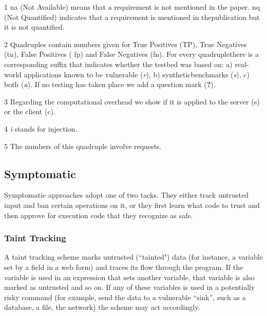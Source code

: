 \documentclass[conference]{IEEEtran}
\begin{document}
\begin{table}
\begin{threeparttable}
\begin{small}
\begin{tablenotes}
\begin{footnotesize}
        \item[1] {\sc na} (Not Available) means that a requirement is not mentioned in the paper.
  {\sc nq} (Not Quantified) indicates that a requirement is mentioned in the\newline publication
  but it is not quantified.
      \item[2] Quadruples contain numbers given for True Positives
        ({\sc TP}), True Negatives ({\sc tn}), False Positives ({\sc
          fp}) and False Negatives ({\sc fn}). For every quadruple\newline there is a corresponding suffix that indicates whether the testbed was
  based on: a) real-world applications known to be vulnerable ({\it r}), b) synthetic\newline benchmarks ({\it s}), c) both ({\it a}).
  If no testing has taken place we add a question mark ({\bf ?}).
    \item[3] Regarding the computational overhead we show if it is applied to the server ({\sc s}) or the client ({\sc c}). 
    \item[4] {\it i} stands for injection.
    \item[5] The numbers of this quadruple involve requests.
  \end{footnotesize}
    \end{tablenotes}
    \end{small}
    \end{threeparttable}
\end{table}

\subsection{Symptomatic}

Symptomatic approaches adopt one of two tacks. They either track
untrusted input and ban certain operations on it, or they first learn what
code to trust and then approve for execution code that they recognize
as safe.

\subsubsection{Taint Tracking}
\label{sec:taint}

A taint tracking scheme marks untrusted (``tainted") data (for
instance, a variable set by a field in a web form) and traces its flow
through the program. If the variable is used in an expression that
sets another variable, that variable is also marked as untrusted and
so on. If any of these variables is used in a potentially risky
command (for example, send the data to a vulnerable ``sink'', such as
a database, a file, the network) the scheme may act accordingly.
\end{document}
